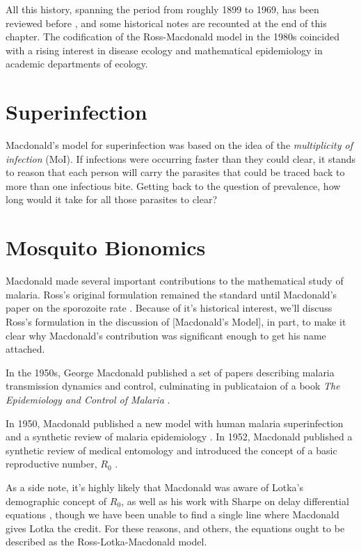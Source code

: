 \documentclass[
]{book}
\begin{document}
All this history, spanning the period from roughly 1899 to 1969, has been reviewed before \autocite{SmithDL2012_RossMacdonald}, and some historical notes are recounted at the end of this chapter.
The codification of the Ross-Macdonald model in the 1980s coincided with a rising interest in disease ecology and mathematical epidemiology in academic departments of ecology.

\section{Superinfection}\label{superinfection}

Macdonald's model for superinfection was based on the idea of the \emph{multiplicity of infection} (MoI). If infections were occurring faster than they could clear, it stands to reason that each person will carry the parasites that could be traced back to more than one infectious bite. Getting back to the question of prevalence, how long would it take for all those parasites to clear?

\section{Mosquito Bionomics}\label{mosquito-bionomics}

Macdonald made several important contributions to the mathematical study of malaria. Ross's original formulation remained the standard until Macdonald's paper on the sporozoite rate \autocite{MacdonaldG1952Sporozoite}. Because of it's historical interest, we'll discuss Ross's formulation in the discussion of {[}Macdonald's Model{]}, in part, to make it clear why Macdonald's contribution was significant enough to get his name attached.

In the 1950s, George Macdonald published a set of papers describing malaria transmission dynamics and control, culminating in publicataion of a book \emph{The Epidemiology and Control of Malaria} \autocite{MacdonaldG1957Book}.

In 1950, Macdonald published a new model with human malaria superinfection \autocite{MacdonaldG1950Superinfection} and a synthetic review of malaria epidemiology \autocite{MacdonaldG1950Epidemiology}. In 1952, Macdonald published a synthetic review of medical entomology \autocite{MacdonaldG1952Sporozoite} and introduced the concept of a basic reproductive number, \(R_0\) \autocite{MacdonaldG1952R0}.

As a side note, it's highly likely that Macdonald was aware of Lotka's demographic concept of \(R_0\), as well as his work with Sharpe on delay differential equations \autocite{LotkaAJ1923part4}, though we have been unable to find a single line where Macdonald gives Lotka the credit. For these reasons, and others, the equations ought to be described as the Ross-Lotka-Macdonald model.
\end{document}
